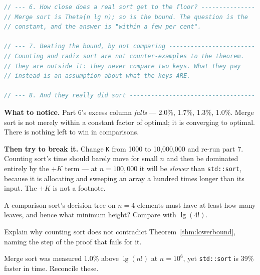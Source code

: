 \begin{lab}
\begin{lstlisting}[language=C++]
// --- 6. How close does a real sort get to the floor? ---------------
// Merge sort is Theta(n lg n); so is the bound. The question is the
// constant, and the answer is "within a few per cent".

// --- 7. Beating the bound, by not comparing ------------------------
// Counting and radix sort are not counter-examples to the theorem.
// They are outside it: they never compare two keys. What they pay
// instead is an assumption about what the keys ARE.

// --- 8. And they really did sort -----------------------------------
\end{lstlisting}

\textbf{What to notice.} Part 6's excess column \emph{falls} --- 2.0\%, 1.7\%,
1.3\%, 1.0\%. Merge sort is not merely within a constant factor of optimal; it
is converging to optimal. There is nothing left to win in comparisons.

\smallskip
\textbf{Then try to break it.} Change \texttt{K} from 1000 to 10{,}000{,}000
and re-run part 7. Counting sort's time should barely move for small $n$ and
then be dominated entirely by the $+K$ term --- at $n = 100{,}000$ it will be
\emph{slower} than \texttt{std::sort}, because it is allocating and sweeping an
array a hundred times longer than its input. The $+K$ is not a footnote.
\end{lab}

\begin{checkpoint}
\begin{tightnum}
  \item A comparison sort's decision tree on $n = 4$ elements must have at
        least how many leaves, and hence what minimum height? Compare with
        $\lg(4!)$.
  \item Explain why counting sort does not contradict
        Theorem~\ref{thm:lowerbound}, naming the step of the proof that fails
        for it.
  \item Merge sort was measured 1.0\% above $\lg(n!)$ at $n = 10^{6}$, yet
        \texttt{std::sort} is 39\% faster in time. Reconcile these.
\end{tightnum}
\end{checkpoint}

